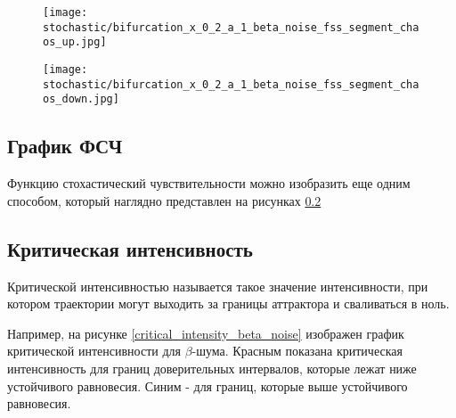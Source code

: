         \begin{figure}
            \centering
            \texttt{[image: stochastic/bifurcation\_x\_0\_2\_a\_1\_beta\_noise\_fss\_segment\_chaos\_up.jpg]}
        
            \captionsetup{justification=centering}
            \caption{}
            \label{bifurcation_x_0_2_a_1_beta_chaos_fss_segment_chaos_up}
        \end{figure}

        \begin{figure}
            \centering
            \texttt{[image: stochastic/bifurcation\_x\_0\_2\_a\_1\_beta\_noise\_fss\_segment\_chaos\_down.jpg]}
        
            \captionsetup{justification=centering}
            \caption{}
            \label{bifurcation_x_0_2_a_1_beta_chaos_fss_segment_chaos_down}
        \end{figure}


    \subsection{График ФСЧ}

        Функцию стохастический чувствительности можно изобразить еще одним способом, который наглядно представлен на рисунках \ref{} 


    \subsection{Критическая интенсивность}

        Критической интенсивностью называется такое значение интенсивности, при котором траектории могут выходить за границы аттрактора и сваливаться в ноль.

        Например, на рисунке \ref{critical_intensity_beta_noise} изображен график критической интенсивности для \(\beta\)-шума. Красным показана критическая интенсивность для границ доверительных интервалов, которые лежат ниже устойчивого равновесия. Синим - для границ, которые выше устойчивого равновесия. 



